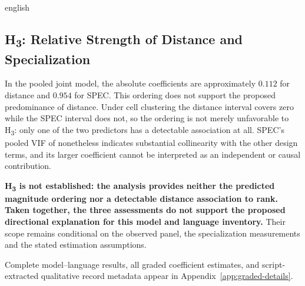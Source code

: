 \begin{otherlanguage*}{english}
\subsection{H\textsubscript{3}: Relative Strength of Distance and Specialization}

In the pooled joint model, the absolute coefficients are approximately $0.112$ for distance and $0.954$ for SPEC. This ordering does not support the proposed predominance of distance. Under cell clustering the distance interval covers zero while the SPEC interval does not, so the ordering is not merely unfavorable to H\textsubscript{3}: only one of the two predictors has a detectable association at all. SPEC's pooled VIF of \GSpecVIF{} nonetheless indicates substantial collinearity with the other design terms, and its larger coefficient cannot be interpreted as an independent or causal contribution.

\textbf{H\textsubscript{3} is not established: the analysis provides neither the predicted magnitude ordering nor a detectable distance association to rank. Taken together, the three assessments do not support the proposed directional explanation for this model and language inventory.} Their scope remains conditional on the observed panel, the specialization measurements and the stated estimation assumptions.

\end{otherlanguage*}

Complete model--language results, all graded coefficient estimates, and script-extracted qualitative record metadata appear in Appendix~\ref{app:graded-details}.
